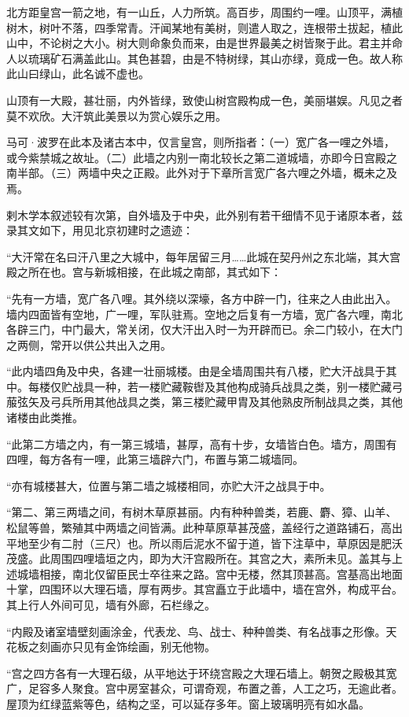 \documentclass[12pt,UTF8]{ctexbook}
\begin{document}
北方距皇宫一箭之地，有一山丘，人力所筑。高百步，周围约一哩。山顶平，满植树木，树叶不落，四季常青。汗闻某地有美树，则遣人取之，连根带土拔起，植此山中，不论树之大小。树大则命象负而来，由是世界最美之树皆聚于此。君主并命人以琉璃矿石满盖此山。其色甚碧，由是不特树绿，其山亦绿，竟成一色。故人称此山曰绿山，此名诚不虚也。

山顶有一大殿，甚壮丽，内外皆绿，致使山树宫殿构成一色，美丽堪娱。凡见之者莫不欢欣。大汗筑此美景以为赏心娱乐之用。

马可·波罗在此本及诸古本中，仅言皇宫，则所指者：（一）宽广各一哩之外墙，或今紫禁城之故址。（二）此墙之内别一南北较长之第二道城墙，亦即今日宫殿之南半部。（三）两墙中央之正殿。此外对于下章所言宽广各六哩之外墙，概未之及焉。

剌木学本叙述较有次第，自外墙及于中央，此外别有若干细情不见于诸原本者，兹录其文如下，用见北京初建时之遗迹：

“大汗常在名曰汗八里之大城中，每年居留三月……此城在契丹州之东北端，其大宫殿之所在也。宫与新城相接，在此城之南部，其式如下：

“先有一方墙，宽广各八哩。其外绕以深壕，各方中辟一门，往来之人由此出入。墙内四面皆有空地，广一哩，军队驻焉。空地之后复有一方墙，宽广各六哩，南北各辟三门，中门最大，常关闭，仅大汗出入时一为开辟而已。余二门较小，在大门之两侧，常开以供公共出入之用。

“此内墙四角及中央，各建一壮丽城楼。由是全墙周围共有八楼，贮大汗战具于其中。每楼仅贮战具一种，若一楼贮藏鞍辔及其他构成骑兵战具之类，别一楼贮藏弓菔弦矢及弓兵所用其他战具之类，第三楼贮藏甲胄及其他熟皮所制战具之类，其他诸楼由此类推。

“此第二方墙之内，有一第三城墙，甚厚，高有十步，女墙皆白色。墙方，周围有四哩，每方各有一哩，此第三墙辟六门，布置与第二城墙同。

“亦有城楼甚大，位置与第二墙之城楼相同，亦贮大汗之战具于中。

“第二、第三两墙之间，有树木草原甚丽。内有种种兽类，若鹿、麝、獐、山羊、松鼠等兽，繁殖其中两墙之间皆满。此种草原草甚茂盛，盖经行之道路铺石，高出平地至少有二肘（三尺）也。所以雨后泥水不留于道，皆下注草中，草原因是肥沃茂盛。此周围四哩墙垣之内，即为大汗宫殿所在。其宫之大，素所未见。盖其与上述城墙相接，南北仅留臣民士卒往来之路。宫中无楼，然其顶甚高。宫基高出地面十掌，四围环以大理石墙，厚有两步。其宫矗立于此墙中，墙在宫外，构成平台。其上行人外间可见，墙有外廊，石栏缘之。

“内殿及诸室墙壁刻画涂金，代表龙、鸟、战士、种种兽类、有名战事之形像。天花板之刻画亦只见有金饰绘画，别无他物。

“宫之四方各有一大理石级，从平地达于环绕宫殿之大理石墙上。朝贺之殿极其宽广，足容多人聚食。宫中房室甚众，可谓奇观，布置之善，人工之巧，无逾此者。屋顶为红绿蓝紫等色，结构之坚，可以延存多年。窗上玻璃明亮有如水晶。
\end{document}

